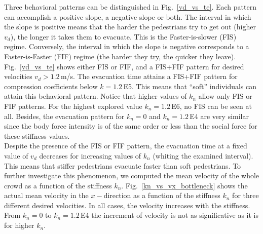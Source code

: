 \documentclass[preprint,12pt]{elsarticle}
\begin{document}
Three behavioral patterns can be distinguished in Fig.~\ref{vd_vs_te}. 
Each pattern can accomplish a positive slope, a negative slope
or both. The interval in which the slope is positive means that the 
harder the pedestrians try to get out (higher $v_d$), the 
longer it takes them to evacuate. This is the Faster-is-slower 
(FIS) regime. Conversely, the interval in which the slope is 
negative  corresponds to a Faster-is-Faster (FIF) regime (the 
harder they try, the quicker they leave).\\

Fig.~\ref{vd_vs_te}  shows either FIS or FIF, and a FIS+FIF pattern
for desired velocities $v_d>1.2\,$m/s. The 
evacuation time attains a FIS+FIF pattern for compression coefficients below 
$k=1.2\,$E5. This means that ``soft'' individuals can attain this 
behavioral pattern.  Notice that higher values of $k_n$ allow 
only FIS or FIF patterns. For the highest explored value $k_n=1.2\,$E6, no 
FIS can be seen at all. Besides, the evacuation pattern for $k_n = 0$ and $k_n 
= 1.2\,$E4 are very similar since the body force intensity is of the same order
or less than the social 
force for these stiffness values. \\

Despite the presence of the FIS or FIF pattern, the evacuation time at a 
fixed value of $v_d$ decreases for increasing values of $k_n$ (whiting the examined interval). 
This means that stiffer pedestrians evacuate faster than soft pedestrians. 
To further investigate this 
phenomenon, we computed the mean velocity of the whole crowd as a function of the 
stiffness $k_n$. Fig.~\ref{kn_vs_vx_bottleneck} shows the actual mean velocity in the 
$x-$direction as a function of the stiffness $k_n$ for three different desired 
velocities. In all cases, the velocity increases with the stiffness. From 
$k_n=0$ to $k_n=1.2\,$E4 the increment of velocity is not as significative as it 
is for higher $k_n$. \\
\end{document}
